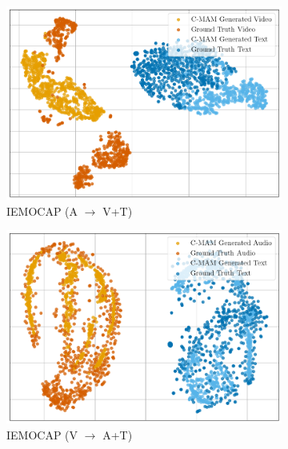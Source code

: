\begin{figure}[!p]
\begin{subfigure}[b]{0.24\textwidth}
        \includegraphics[width=\textwidth]{imgs/tsne/mmin/iemocap/cmam_audio_tsne.png}
        \caption*{IEMOCAP (A $\rightarrow$ V+T)}
    \end{subfigure}
    \begin{subfigure}[b]{0.24\textwidth}
        \centering
        \includegraphics[width=\textwidth]{imgs/tsne/mmin/iemocap/cmam_video_tsne.png}
        \caption*{IEMOCAP (V $\rightarrow$ A+T)}
    \end{subfigure}
    \\
    \begin{subfigure}[b]{0.24\textwidth}
        \centering

\end{subfigure}
\end{figure}
